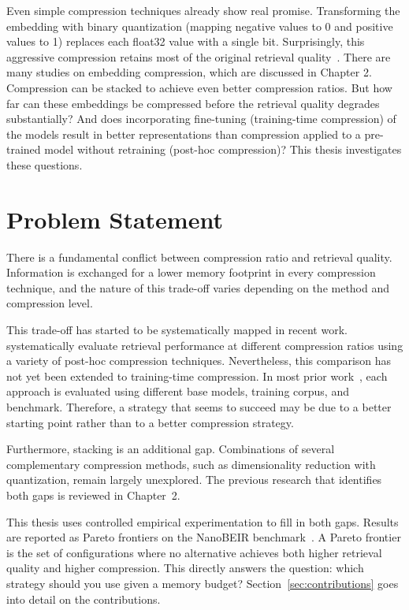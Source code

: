 Even simple compression techniques already show real promise. Transforming the embedding with binary quantization (mapping negative values to 0 and positive values to 1) replaces each float32 value with a single bit. Surprisingly, this aggressive compression retains most of the original retrieval quality~\cite{shakir2024embedding}. There are many studies on embedding compression, which are discussed in Chapter 2. Compression can be stacked to achieve even better compression ratios. But how far can these embeddings be compressed before the retrieval quality degrades substantially? And does incorporating fine-tuning (training-time compression) of the models result in better representations than compression applied to a pre-trained model without retraining (post-hoc compression)? This thesis investigates these questions.

\section{Problem Statement}

There is a fundamental conflict between compression ratio and retrieval quality. Information is exchanged for a lower memory footprint in every compression technique, and the nature of this trade-off varies depending on the method and compression level.

This trade-off has started to be systematically mapped in recent work. \citet{correct2025} systematically evaluate retrieval performance at different compression ratios using a variety of post-hoc compression techniques. Nevertheless, this comparison has not yet been extended to training-time compression. In most prior work~\cite{yamada2021efficient, gan2023binary, shakir2024embedding, qama2025}, each approach is evaluated using different base models, training corpus, and benchmark. Therefore, a strategy that seems to succeed may be due to a better starting point rather than to a better compression strategy.

Furthermore, stacking is an additional gap. Combinations of several complementary compression methods, such as dimensionality reduction with quantization, remain largely unexplored. The previous research that identifies both gaps is reviewed in Chapter~2.

This thesis uses controlled empirical experimentation to fill in both gaps. Results are reported as Pareto frontiers on the NanoBEIR benchmark~\cite{thakur2021beir}. A Pareto frontier is the set of configurations where no alternative achieves both higher retrieval quality and higher compression. This directly answers the question: which strategy should you use given a memory budget? Section~\ref{sec:contributions} goes into detail on the contributions.

